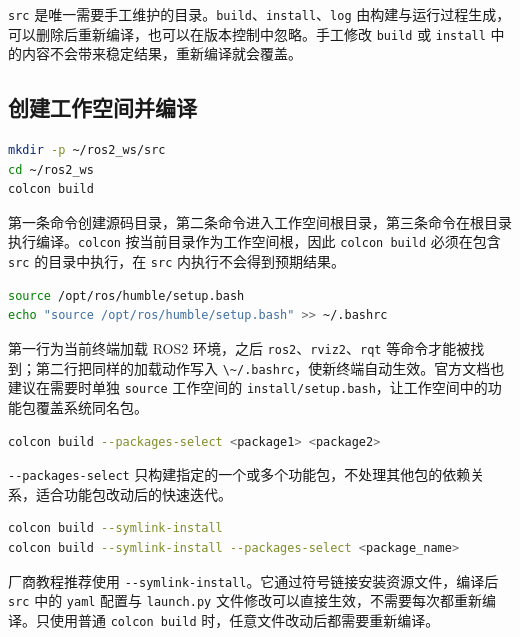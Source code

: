 \passthrough{\lstinline!src!}
是唯一需要手工维护的目录。\passthrough{\lstinline!build!}、\passthrough{\lstinline!install!}、\passthrough{\lstinline!log!}
由构建与运行过程生成，可以删除后重新编译，也可以在版本控制中忽略。手工修改
\passthrough{\lstinline!build!} 或 \passthrough{\lstinline!install!}
中的内容不会带来稳定结果，重新编译就会覆盖。

\subsection{创建工作空间并编译}\label{ux521bux5efaux5de5ux4f5cux7a7aux95f4ux5e76ux7f16ux8bd1}

\begin{lstlisting}[language=bash]
mkdir -p ~/ros2_ws/src
cd ~/ros2_ws
colcon build
\end{lstlisting}

第一条命令创建源码目录，第二条命令进入工作空间根目录，第三条命令在根目录执行编译。\passthrough{\lstinline!colcon!}
按当前目录作为工作空间根，因此 \passthrough{\lstinline!colcon build!}
必须在包含 \passthrough{\lstinline!src!} 的目录中执行，在
\passthrough{\lstinline!src!} 内执行不会得到预期结果。

\begin{lstlisting}[language=bash]
source /opt/ros/humble/setup.bash
echo "source /opt/ros/humble/setup.bash" >> ~/.bashrc
\end{lstlisting}

第一行为当前终端加载 ROS2 环境，之后
\passthrough{\lstinline!ros2!}、\passthrough{\lstinline!rviz2!}、\passthrough{\lstinline!rqt!}
等命令才能被找到；第二行把同样的加载动作写入
\passthrough{\lstinline!\~/.bashrc!}，使新终端自动生效。官方文档也建议在需要时单独
\passthrough{\lstinline!source!} 工作空间的
\passthrough{\lstinline!install/setup.bash!}，让工作空间中的功能包覆盖系统同名包。

\begin{lstlisting}[language=bash]
colcon build --packages-select <package1> <package2>
\end{lstlisting}

\passthrough{\lstinline!--packages-select!}
只构建指定的一个或多个功能包，不处理其他包的依赖关系，适合功能包改动后的快速迭代。

\begin{lstlisting}[language=bash]
colcon build --symlink-install
colcon build --symlink-install --packages-select <package_name>
\end{lstlisting}

厂商教程推荐使用
\passthrough{\lstinline!--symlink-install!}。它通过符号链接安装资源文件，编译后
\passthrough{\lstinline!src!} 中的 \passthrough{\lstinline!yaml!} 配置与
\passthrough{\lstinline!launch.py!}
文件修改可以直接生效，不需要每次都重新编译。只使用普通
\passthrough{\lstinline!colcon build!}
时，任意文件改动后都需要重新编译。

